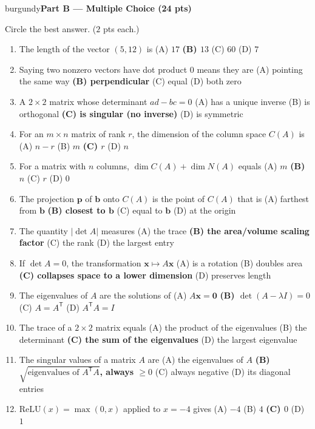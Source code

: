 \documentclass[10pt]{article}
\newcommand{\xx}{\mathbf{x}}
\newcommand{\bb}{\mathbf{b}}
\newcommand{\pp}{\mathbf{p}}
\newcommand{\zero}{\mathbf{0}}
\newcommand{\relu}{\mathrm{ReLU}}
\newcommand{\T}{\mathsf{T}}
\newcommand{\parthead}[1]{%
  \vspace{6pt}\noindent
  \begin{headlinebox}{burgundy}{\color{white}\bfseries #1}\end{headlinebox}%
  \vspace{4pt}}
\begin{document}
\parthead{Part B --- Multiple Choice (24 pts)}
Circle the best answer. ($2$ pts each.)

\begin{enumerate}[leftmargin=1.9em, itemsep=8pt]
  \item The length of the vector $(5,12)$ is
    \hfill (A) $17$ \quad \textbf{(B) $13$} \ans{$\leftarrow$} \quad (C) $60$ \quad (D) $7$
  \item Saying two nonzero vectors have dot product $0$ means they are
    \hfill (A) pointing the same way \quad \textbf{(B) perpendicular} \ans{$\leftarrow$} \quad (C) equal \quad (D) both zero
  \item A $2\times2$ matrix whose determinant $ad-bc=0$
    \hfill (A) has a unique inverse \quad (B) is orthogonal \quad \textbf{(C) is singular (no inverse)} \ans{$\leftarrow$} \quad (D) is symmetric
  \item For an $m\times n$ matrix of rank $r$, the dimension of the column space $C(A)$ is
    \hfill (A) $n-r$ \quad (B) $m$ \quad \textbf{(C) $r$} \ans{$\leftarrow$} \quad (D) $n$
  \item For a matrix with $n$ columns, $\dim C(A)+\dim N(A)$ equals
    \hfill (A) $m$ \quad \textbf{(B) $n$} \ans{$\leftarrow$} \quad (C) $r$ \quad (D) $0$
  \item The projection $\pp$ of $\bb$ onto $C(A)$ is the point of $C(A)$ that is
    \hfill (A) farthest from $\bb$ \quad \textbf{(B) closest to $\bb$} \ans{$\leftarrow$} \quad (C) equal to $\bb$ \quad (D) at the origin
  \item The quantity $|\det A|$ measures
    \hfill (A) the trace \quad \textbf{(B) the area/volume scaling factor} \ans{$\leftarrow$} \quad (C) the rank \quad (D) the largest entry
  \item If $\det A=0$, the transformation $\xx\mapsto A\xx$
    \hfill (A) is a rotation \quad (B) doubles area \quad \textbf{(C) collapses space to a lower dimension} \ans{$\leftarrow$} \quad (D) preserves length
  \item The eigenvalues of $A$ are the solutions of
    \hfill (A) $A\xx=\zero$ \quad \textbf{(B) $\det(A-\lambda I)=0$} \ans{$\leftarrow$} \quad (C) $A=A^\T$ \quad (D) $A^\T A=I$
  \item The trace of a $2\times2$ matrix equals
    \hfill (A) the product of the eigenvalues \quad (B) the determinant \quad \textbf{(C) the sum of the eigenvalues} \ans{$\leftarrow$} \quad (D) the largest eigenvalue
  \item The singular values of a matrix $A$ are
    \hfill (A) the eigenvalues of $A$ \quad \textbf{(B) $\sqrt{\text{eigenvalues of }A^\T A}$, always $\ge0$} \ans{$\leftarrow$} \quad (C) always negative \quad (D) its diagonal entries
  \item $\relu(x)=\max(0,x)$ applied to $x=-4$ gives
    \hfill (A) $-4$ \quad (B) $4$ \quad \textbf{(C) $0$} \ans{$\leftarrow$} \quad (D) $1$
\end{enumerate}
\end{document}
